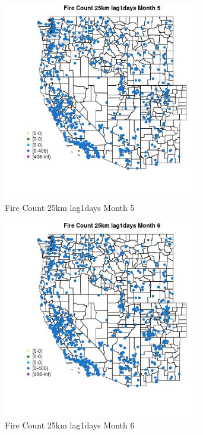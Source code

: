 \begin{figure} 
\centering  
\includegraphics[width=0.77\textwidth]{Code_Outputs/Report_ML_input_PM25_Step4_part_f_de_duplicated_aveswNAs_MapObsMo5Fire_Count_25km_lag1days.jpg} 
\caption{\label{fig:Report_ML_input_PM25_Step4_part_f_de_duplicated_aveswNAsMapObsMo5Fire_Count_25km_lag1days}Fire Count 25km lag1days Month 5} 
\end{figure} 
 

\begin{figure} 
\centering  
\includegraphics[width=0.77\textwidth]{Code_Outputs/Report_ML_input_PM25_Step4_part_f_de_duplicated_aveswNAs_MapObsMo6Fire_Count_25km_lag1days.jpg} 
\caption{\label{fig:Report_ML_input_PM25_Step4_part_f_de_duplicated_aveswNAsMapObsMo6Fire_Count_25km_lag1days}Fire Count 25km lag1days Month 6} 
\end{figure} 
 

